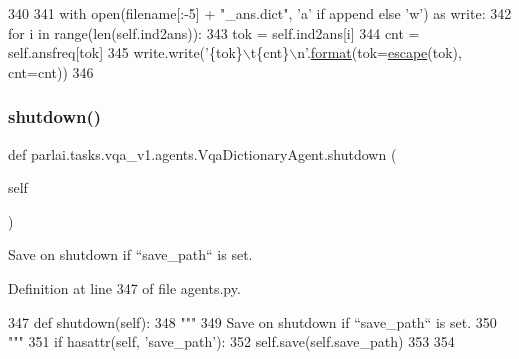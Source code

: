 \begin{DoxyCode}
340 
341         with open(filename[:-5] + \textcolor{stringliteral}{"\_ans.dict"}, \textcolor{stringliteral}{'a'} \textcolor{keywordflow}{if} append \textcolor{keywordflow}{else} \textcolor{stringliteral}{'w'}) \textcolor{keyword}{as} write:
342             \textcolor{keywordflow}{for} i \textcolor{keywordflow}{in} range(len(self.ind2ans)):
343                 tok = self.ind2ans[i]
344                 cnt = self.ansfreq[tok]
345                 write.write(\textcolor{stringliteral}{'\{tok\}\(\backslash\)t\{cnt\}\(\backslash\)n'}.\hyperlink{namespaceparlai_1_1chat__service_1_1services_1_1messenger_1_1shared__utils_a32e2e2022b824fbaf80c747160b52a76}{format}(tok=\hyperlink{namespaceparlai_1_1tasks_1_1vqa__v1_1_1agents_a09703660c96aab40da3aa7f2386486cb}{escape}(tok), cnt=cnt))
346 
\end{DoxyCode}
\mbox{\label{classparlai_1_1tasks_1_1vqa__v1_1_1agents_1_1VqaDictionaryAgent_afcebdb70582204709f5e4365dde00bcb}} 
\subsubsection{\texorpdfstring{shutdown()}{shutdown()}}
{\footnotesize\ttfamily def parlai.\+tasks.\+vqa\+\_\+v1.\+agents.\+Vqa\+Dictionary\+Agent.\+shutdown (\begin{DoxyParamCaption}\item[{}]{self }\end{DoxyParamCaption})}

\begin{DoxyVerb}Save on shutdown if ``save_path`` is set.
\end{DoxyVerb}
 

Definition at line 347 of file agents.\+py.


\begin{DoxyCode}
347     \textcolor{keyword}{def }shutdown(self):
348         \textcolor{stringliteral}{"""}
349 \textcolor{stringliteral}{        Save on shutdown if ``save\_path`` is set.}
350 \textcolor{stringliteral}{        """}
351         \textcolor{keywordflow}{if} hasattr(self, \textcolor{stringliteral}{'save\_path'}):
352             self.save(self.save\_path)
353 
354 
\end{DoxyCode}
\mbox{\label{classparlai_1_1tasks_1_1vqa__v1_1_1agents_1_1VqaDictionaryAgent_a59f1738f5c3fdcadd0a8ece0d53c5d6e}} 
